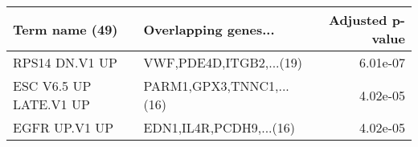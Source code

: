 \begin{tabular}{llr}
\toprule
        Term name (49) &     Overlapping genes... &  Adjusted p-value \\
\midrule
        RPS14 DN.V1 UP &  VWF,PDE4D,ITGB2,...(19) &          6.01e-07 \\
ESC V6.5 UP LATE.V1 UP & PARM1,GPX3,TNNC1,...(16) &          4.02e-05 \\
         EGFR UP.V1 UP &  EDN1,IL4R,PCDH9,...(16) &          4.02e-05 \\
\bottomrule
\end{tabular}
